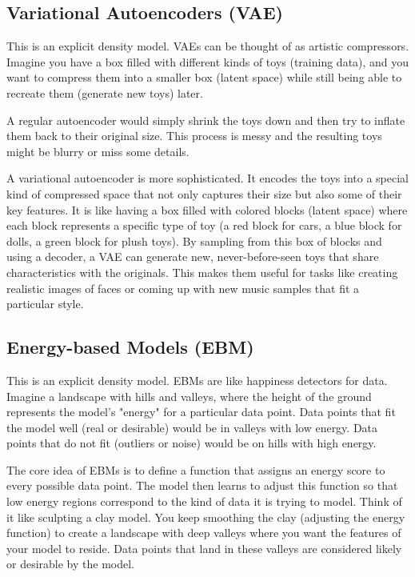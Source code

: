 \documentclass[10pt, letterpaper, twoside]{article}
\begin{document}
\subsection{Variational Autoencoders (VAE)}\label{sec:variational_encoders}

This is an explicit density model. VAEs can be thought of as artistic compressors. Imagine you have a box filled with different kinds of toys (training data), and you want to compress them into a smaller box (latent space) while still being able to recreate them (generate new toys) later.

A regular autoencoder would simply shrink the toys down and then try to inflate them back to their original size. This process is messy and the resulting toys might be blurry or miss some details.

A variational autoencoder is more sophisticated. It encodes the toys into a special kind of compressed space that not only captures their size but also some of their key features. It is like having a box filled with colored blocks (latent space) where each block represents a specific type of toy (a red block for cars, a blue block for dolls, a green block for plush toys). By sampling from this box of blocks and using a decoder, a VAE can generate new, never-before-seen toys that share characteristics with the originals. This makes them useful for tasks like creating realistic images of faces or coming up with new music samples that fit a particular style.

\subsection{Energy-based Models (EBM)}\label{sec:energy_based_models}

This is an explicit density model. EBMs are like happiness detectors for data. Imagine a landscape with hills and valleys, where the height of the ground represents the model’s "energy" for a particular data point. Data points that fit the model well (real or desirable) would be in valleys with low energy. Data points that do not fit (outliers or noise) would be on hills with high energy.

The core idea of EBMs is to define a function that assigns an energy score to every possible data point. The model then learns to adjust this function so that low energy regions correspond to the kind of data it is trying to model. Think of it like sculpting a clay model. You keep smoothing the clay (adjusting the energy function) to create a landscape with deep valleys where you want the features of your model to reside. Data points that land in these valleys are considered likely or desirable by the model.
\end{document}

